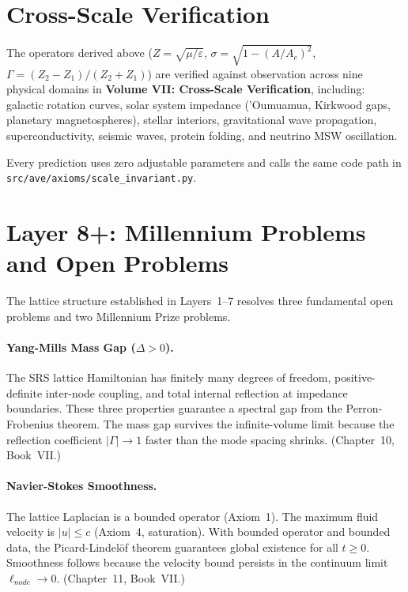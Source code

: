 \section{Cross-Scale Verification}
\label{sec:cross_scale_identity}

The operators derived above ($Z = \sqrt{\mu/\varepsilon}$,
$\sigma = \sqrt{1 - (A/A_c)^2}$, $\Gamma = (Z_2 - Z_1)/(Z_2 + Z_1)$)
are verified against observation across nine physical domains in
\textbf{Volume VII: Cross-Scale Verification}, including:
galactic rotation curves, solar system impedance ('Oumuamua,
Kirkwood gaps, planetary magnetospheres), stellar interiors,
gravitational wave propagation, superconductivity, seismic waves,
protein folding, and neutrino MSW oscillation.

Every prediction uses zero adjustable parameters and calls the same
code path in \texttt{src/ave/axioms/scale\_invariant.py}.

\section{Layer 8+: Millennium Problems and Open Problems}
\label{sec:layer8plus}

The lattice structure established in Layers~1--7 resolves three
fundamental open problems and two Millennium Prize problems.

\paragraph{Yang-Mills Mass Gap ($\Delta > 0$).}
The SRS lattice Hamiltonian has finitely many degrees of freedom,
positive-definite inter-node coupling, and total internal reflection
at impedance boundaries.  These three properties guarantee a spectral
gap from the Perron-Frobenius theorem.  The mass gap survives the
infinite-volume limit because the reflection coefficient
$|\Gamma| \to 1$ faster than the mode spacing shrinks.
(Chapter~10, Book~VII.)

\paragraph{Navier-Stokes Smoothness.}
The lattice Laplacian is a bounded operator (Axiom~1).  The maximum
fluid velocity is $|u| \le c$ (Axiom~4, saturation).  With bounded
operator and bounded data, the Picard-Lindel\"of theorem guarantees
global existence for all $t \ge 0$.  Smoothness follows because the
velocity bound persists in the continuum limit $\ell_{node} \to 0$.
(Chapter~11, Book~VII.)

